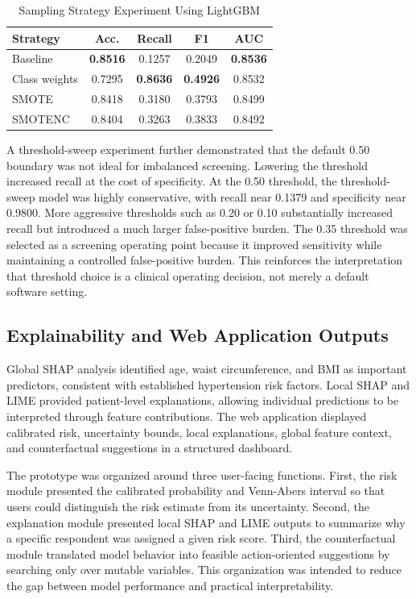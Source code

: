 \documentclass[journal]{IEEEtran}
\begin{document}
\begin{table}[!t]
\caption{Sampling Strategy Experiment Using LightGBM}
\label{tab:sampling}
\centering
\footnotesize
\begin{tabular}{lcccc}
\toprule
Strategy & Acc. & Recall & F1 & AUC\\
\midrule
Baseline & \textbf{0.8516} & 0.1257 & 0.2049 & \textbf{0.8536}\\
Class weights & 0.7295 & \textbf{0.8636} & \textbf{0.4926} & 0.8532\\
SMOTE & 0.8418 & 0.3180 & 0.3793 & 0.8499\\
SMOTENC & 0.8404 & 0.3263 & 0.3833 & 0.8492\\
\bottomrule
\end{tabular}
\end{table}

A threshold-sweep experiment further demonstrated that the default 0.50 boundary was not ideal for imbalanced screening. Lowering the threshold increased recall at the cost of specificity. At the 0.50 threshold, the threshold-sweep model was highly conservative, with recall near 0.1379 and specificity near 0.9800. More aggressive thresholds such as 0.20 or 0.10 substantially increased recall but introduced a much larger false-positive burden. The 0.35 threshold was selected as a screening operating point because it improved sensitivity while maintaining a controlled false-positive burden. This reinforces the interpretation that threshold choice is a clinical operating decision, not merely a default software setting.

\subsection{Explainability and Web Application Outputs}
Global SHAP analysis identified age, waist circumference, and BMI as important predictors, consistent with established hypertension risk factors. Local SHAP and LIME provided patient-level explanations, allowing individual predictions to be interpreted through feature contributions. The web application displayed calibrated risk, uncertainty bounds, local explanations, global feature context, and counterfactual suggestions in a structured dashboard.

The prototype was organized around three user-facing functions. First, the risk module presented the calibrated probability and Venn-Abers interval so that users could distinguish the risk estimate from its uncertainty. Second, the explanation module presented local SHAP and LIME outputs to summarize why a specific respondent was assigned a given risk score. Third, the counterfactual module translated model behavior into feasible action-oriented suggestions by searching only over mutable variables. This organization was intended to reduce the gap between model performance and practical interpretability.
\end{document}
